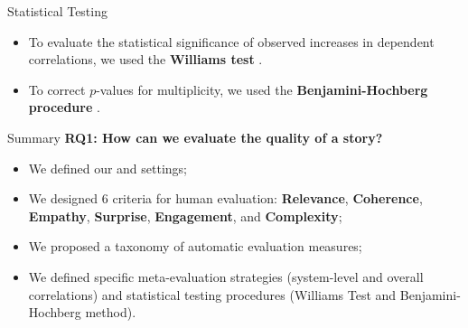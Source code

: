 \begin{frame}{Statistical Testing}
    \begin{itemize}
        \item To evaluate the statistical significance of observed increases in dependent correlations, we used the \textbf{Williams test} \citep{graham-baldwin-2014-testing}.
        \item To correct $p$-values for multiplicity, we used the \textbf{Benjamini-Hochberg procedure} \citep{benjamini1995controlling}.
    \end{itemize}
\end{frame}

\begin{frame}{Summary}
    \textbf{RQ1: How can we evaluate the quality of a story?}
    \begin{itemize}
        \item We defined our {\asg} and {\ase} settings;
        \item We designed 6 criteria for human evaluation: \textbf{Relevance}, \textbf{Coherence}, \textbf{Empathy}, \textbf{Surprise}, \textbf{Engagement}, and \textbf{Complexity};
        \item We proposed a taxonomy of automatic evaluation measures;
        \item We defined specific meta-evaluation strategies (system-level and overall correlations) and statistical testing procedures (Williams Test and Benjamini-Hochberg method).
    \end{itemize}
\end{frame}